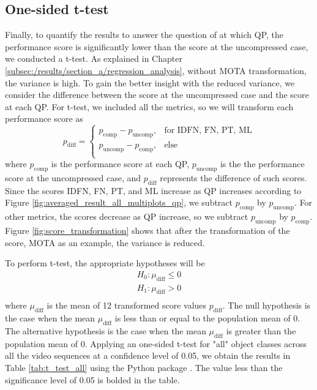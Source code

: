 \subsection{One-sided t-test}
\label{subsec:/results/section_a/t_test}
Finally, to quantify the results to answer the question of at which QP, the performance score is significantly lower than the score at the uncompressed case, we conducted a t-test. 
As explained in Chapter \ref{subsec:/results/section_a/regression_analysis}, without MOTA transformation, the variance is high. To gain the better insight with the reduced variance, we consider the difference between the score at the uncompressed case and the score at each QP. For t-test, we included all the metrics, so we will transform each performance score as
\begin{equation}
  p_{\text{diff}} =
    \begin{cases}
         p_{\text{comp}} - p_{\text{uncomp}} ,& \text{for IDFN, FN, PT, ML} \\        
         p_{\text{uncomp}} - p_{\text{comp}} ,& \text{else} \\
    \end{cases}
\end{equation}
where $p_{\text{comp}}$ is the performance score at each QP, $p_{\text{uncomp}}$ is the the performance score at the uncompressed case, and $p_{\text{diff}}$ represents the difference of such scores. Since the scores IDFN, FN, PT, and ML increase as QP increases according to Figure \ref{fig:averaged_result_all_multiplots_qp}, we subtract $p_{\text{comp}}$ by $p_{\text{uncomp}}$. For other metrics, the scores decrease as QP increase, so we subtract $p_{\text{uncomp}}$ by $p_{\text{comp}}$. Figure \ref{fig:score_transformation} shows that after the transformation of the score, MOTA as an example, the variance is reduced.

To perform t-test, the appropriate hypotheses will be
\begin{equation}
    \begin{aligned}
        H_0 : \mu_{\text{diff}} \leq 0 \\
        H_1 : \mu_{\text{diff}} > 0 \\
    \end{aligned}
\end{equation}
where $\mu_{\text{diff}}$ is the mean of 12 transformed score values $p_{\text{diff}}$. The null hypothesis is the case when the mean $\mu_{\text{diff}}$ is less than or equal to the population mean of 0. The alternative hypothesis is the case when the mean $\mu_{\text{diff}}$ is greater than the population mean of 0. Applying an one-sided t-test for "all" object classes across all the video sequences at a confidence level of 0.05, we obtain the results in Table \ref{tab:t_test_all} using the Python package \cite{virtanen_scipy_2020}. The value less than the significance level of 0.05 is bolded in the table.
